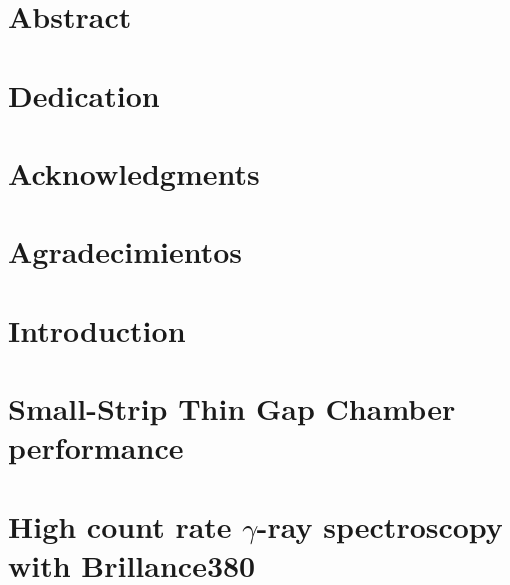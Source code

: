 








\chapter*{Abstract}



\chapter*{Dedication}


\chapter*{Acknowledgments}
\chapter*{Agradecimientos}


\tableofcontents


\chapter{Introduction}



\chapter{Small-Strip Thin Gap Chamber performance}



\chapter{High count rate $\gamma$-ray spectroscopy with Brillance380 }


